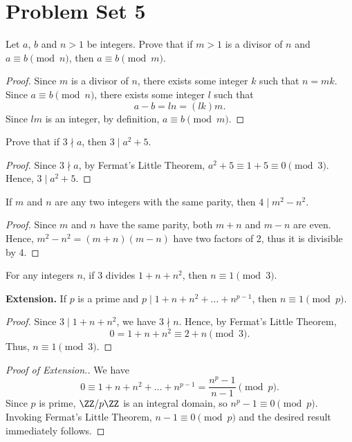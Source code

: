 \section{Problem Set 5}

\begin{problem}
    Let $a$, $b$ and $n > 1$ be integers. Prove that if $m > 1$ is a divisor of $n$ and $a \equiv b \pmod{n}$, then $a \equiv b \pmod{m}$.
\end{problem}
\begin{proof}
    Since $m$ is a divisor of $n$, there exists some integer $k$ such that $n = mk$. Since $a \equiv b \pmod{n}$, there exists some integer $l$ such that \[a - b = ln = (lk)m.\] Since $lm$ is an integer, by definition, $a \equiv b \pmod{m}$.
\end{proof}

\begin{problem}
    Prove that if $3 \nmid a$, then $3 \mid a^2 + 5$.
\end{problem}
\begin{proof}
    Since $3 \nmid a$, by Fermat's Little Theorem, $a^2 +5 \equiv 1 + 5 \equiv 0 \pmod{3}$. Hence, $3 \mid a^2 + 5$.
\end{proof}

\begin{problem}
    If $m$ and $n$ are any two integers with the same parity, then $4 \mid m^2 - n^2$.
\end{problem}
\begin{proof}
    Since $m$ and $n$ have the same parity, both $m+n$ and $m-n$ are even. Hence, $m^2 - n^2 = (m+n)(m-n)$ have two factors of 2, thus it is divisible by 4.
\end{proof}

\begin{problem}
    For any integers $n$, if 3 divides $1 + n + n^2$, then $n \equiv 1 \pmod{3}$.

    \noindent\textbf{Extension.} If $p$ is a prime and $p \mid 1 + n + n^2 + \dots + n^{p-1}$, then $n \equiv 1 \pmod{p}$.
\end{problem}
\begin{proof}
    Since $3 \mid 1 + n + n^2$, we have $3 \nmid n$. Hence, by Fermat's Little Theorem, \[0 = 1 + n + n^2 \equiv 2 + n \pmod{3}.\] Thus, $n \equiv 1 \pmod{3}$.
\end{proof}
\begin{proof}[Proof of Extension.]
    We have \[0 \equiv 1 + n + n^2 + \dots + n^{p-1} = \frac{n^p - 1}{n - 1} \pmod{p}.\] Since $p$ is prime, $\ZZ / p\ZZ$ is an integral domain, so $n^p - 1 \equiv 0 \pmod{p}$. Invoking Fermat's Little Theorem, $n - 1 \equiv 0 \pmod{p}$ and the desired result immediately follows.
\end{proof}

